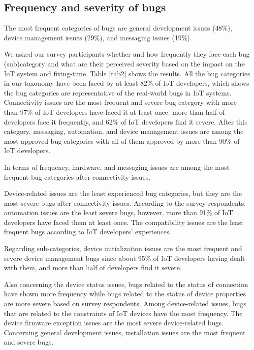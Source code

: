 \subsection{Frequency and severity of bugs}

The most frequent categories of bugs are general development issues (48\%), device management issues (29\%), and messaging issues (19\%). 

We asked our survey participants whether and how frequently they face each bug (sub)category and what are their perceived severity based on the impact on the IoT system and fixing-time. Table \ref{tab2} shows the results.  All the bug categories in our taxonomy have been faced by at least 82\% of IoT developers, which shows the bug categories are representative of the real-world bugs in IoT systems. Connectivity issues are the most frequent and severe bug category with more than 97\% of IoT developers have faced it at least once. more than half of developers face it frequently, and 62\% of IoT developers find it severe. After this category, messaging, automation, and device management issues are among the most approved bug categories with all of them approved by more than 90\% of IoT developers. 

In terms of frequency, hardware, and messaging issues are among the most frequent bug categories after connectivity issues. 

Device-related issues are the least experienced bug categories, but they are the most severe bugs after connectivity issues. According to the survey respondents, automation issues are the least severe bugs, however, more than 91\% of IoT developers have faced them at least once. The compatibility issues are the least frequent bugs according to IoT developers' experiences.

Regarding sub-categories, device initialization issues are the most frequent and severe device management bugs since about 95\% of IoT developers having dealt with them, and more than half of developers find it severe. 

Also concerning the device status issues, bugs related to the status of connection have shown more frequency while bugs related to the status of device properties are more severe based on survey respondents. Among device-related issues, bugs that are related to the constraints of IoT devices have the most frequency. The device firmware exception issues are the most severe device-related bugs. Concerning general development issues, installation issues are the most frequent and severe bugs. 

